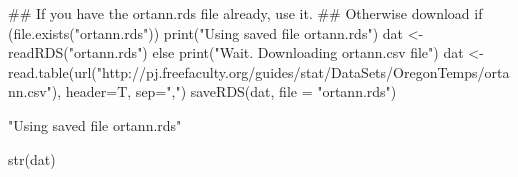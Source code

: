 \begin{Schunk}
\begin{Sinput}
 ## If you have the ortann.rds file already, use it.
 ## Otherwise download
 if (file.exists("ortann.rds")){
      print("Using saved file ortann.rds")
      dat <- readRDS("ortann.rds")
  } else {
      print("Wait. Downloading ortann.csv file")
  dat <- read.table(url("http://pj.freefaculty.org/guides/stat/DataSets/OregonTemps/ortann.csv"), header=T, sep=",")
      saveRDS(dat, file = "ortann.rds")
  }
\end{Sinput}
\begin{Soutput}
[1] "Using saved file ortann.rds"
\end{Soutput}
\begin{Sinput}
 str(dat)
\end{Sinput}
\end{Schunk}
